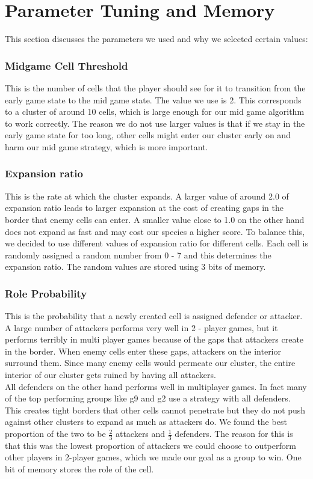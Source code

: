 \section{Parameter Tuning and Memory}
This section discusses the parameters we used and why we selected certain values:\\

\subsubsection{Midgame Cell Threshold} 
This is the number of cells that the player should see for it to transition from the early game state to the mid game state. The value we use is 2. This corresponds to a cluster of around 10 cells, which is large enough for our mid game algorithm to work correctly. The reason we do not use larger values is that if we stay in the early game state for too long, other cells might enter our cluster early on and harm our mid game strategy, which is more important.


\subsubsection{Expansion ratio}
This is the rate at which the cluster expands. A larger value of around 2.0 of expansion ratio leads to larger expansion at the cost of creating gaps in the border that enemy cells can enter. A smaller value close to 1.0 on the other hand does not expand as fast and may cost our species a higher score. To balance this, we decided to use different values of expansion ratio for different cells. Each cell is randomly assigned a random number from 0 - 7 and this determines the expansion ratio. The random values are stored using 3 bits of memory.


\subsubsection{Role Probability} This is the probability that a newly created cell is assigned defender or attacker. A large number of attackers performs very well in 2 - player games, but it performs terribly in multi player games because of the gaps that attackers create in the border. When enemy cells enter these gaps, attackers on the interior surround them. Since many enemy cells would permeate our cluster, the entire interior of our cluster gets ruined by having all attackers. \\
All defenders on the other hand performs well in multiplayer games. In fact many of the top performing groups like g9 and g2 use a strategy with all defenders. This creates tight borders that other cells cannot penetrate but they do not push against other clusters to expand as much as attackers do. We found the best proportion of the two to be $\frac{2}{3}$ attackers and $\frac{1}{3}$ defenders. The reason for this is that this was the lowest proportion of attackers we could choose to outperform other players in 2-player games, which we made our goal as a group to win.
One bit of memory stores the role of the cell. \\

